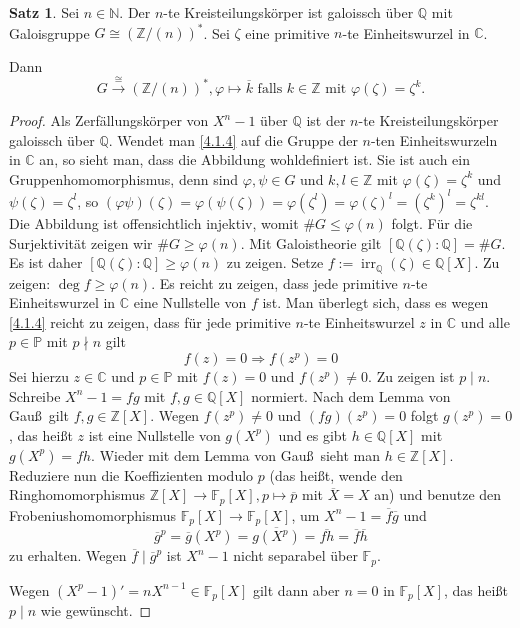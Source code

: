 \documentclass[
twoside=semi,
fontsize=12,
DIV=12, 
cleardoublepage=current,
leqno,
headings=optiontoheadandtoc, 
toc=idx
]{scrbook}
\newcommand{\N}{\mathbb{N}}
\newcommand{\Z}{\mathbb{Z}}
\newcommand{\Q}{\mathbb{Q}}
\newcommand{\C}{\mathbb{C}}
\newcommand{\F}{\mathbb{F}}
\renewcommand{\P}{\mathbb{P}}
\DeclareMathOperator{\irr}{irr}
\theoremstyle{definition}
\newtheorem{satz}[definition]{Satz}
\begin{document}
 	\begin{satz}\label{4.1.11}\hfill\newline
 		Sei $n \in \N$. Der $n$-te Kreisteilungsk\"orper ist galoissch \"uber $\Q$ mit Galoisgruppe $G\cong (\Z/(n))^*$. Sei $\zeta$ eine primitive $n$-te Einheitswurzel in $\C$.
 		
 		\medskip\noindent
 		Dann
 			\[G \overset{\cong}{\to} (\Z/(n))^*, \varphi \mapsto \overline{k} \textrm{ falls } k \in \Z \textrm{ mit } \varphi(\zeta) = \zeta^k.\]
 		
 		\begin{proof}
 			Als Zerf\"allungsk\"orper von $X^n-1$ \"uber $\Q$ ist der $n$-te Kreisteilungsk\"orper galoissch \"uber $\Q$. Wendet man \ref{4.1.4} auf die Gruppe der $n$-ten
 			Einheitswurzeln in $\C$ an, so sieht man, dass die Abbildung wohldefiniert ist. Sie ist auch ein Gruppenhomomorphismus, denn sind $\varphi, \psi \in G$ und $k, l \in \Z$ mit 
 			$\varphi(\zeta) = \zeta^k$ und $\psi(\zeta) = \zeta^l$, so $(\varphi\psi)(\zeta) = \varphi(\psi(\zeta)) = \varphi(\zeta^l) = \varphi(\zeta)^l = (\zeta^k)^l = \zeta^{kl}$. Die Abbildung ist offensichtlich injektiv, womit $\#G \leq \varphi(n)$ folgt. F\"ur die Surjektivit\"at zeigen wir $\#G \geq \varphi(n)$. Mit Galoistheorie gilt $[\Q(\zeta):\Q] =\#G$. Es ist daher $[\Q(\zeta):\Q] \geq \varphi(n)$ zu zeigen. Setze $f:=\irr_\Q(\zeta) \in \Q[X]$. Zu zeigen: $\deg f \geq \varphi(n)$. Es reicht zu zeigen, dass jede primitive $n$-te Einheitswurzel in $\C$ eine Nullstelle von $f$ ist. Man \"uberlegt sich, dass es wegen \ref{4.1.4} reicht zu zeigen, dass f\"ur jede primitive $n$-te Einheitswurzel $z$ in $\C$ und alle $p \in \P$ mit $p \nmid n$ gilt
 				\[f(z) = 0 \Longrightarrow f(z^p) = 0\]
 			Sei hierzu $z \in \C$ und $p \in \P$ mit $f(z) = 0$ und $f(z^p) \neq 0$. Zu zeigen ist $p \mid n$. Schreibe $X^n-1 = fg$ mit
 			$f,g \in \Q[X]$ normiert. Nach dem Lemma von Gau\ss\ gilt $f, g \in \Z[X]$. Wegen $f(z^p) \neq 0$ und $(fg)(z^p) = 0$ folgt $g(z^p) = 0$, das 
 			hei\ss t $z$ ist eine Nullstelle von $g(X^p)$ und es gibt $h \in \Q[X]$ mit $g(X^p) = fh$. Wieder mit dem Lemma von Gau\ss\ sieht man $h \in \Z[X]$. Reduziere nun die Koeffizienten modulo $p$ (das hei\ss t, wende den Ringhomomorphismus $\Z[X] \to \F_p[X], p \mapsto \overline{p}$ mit $\overline{X} = X$ an) und benutze den Frobeniushomomorphismus $\F_p[X] \to \F_p[X]$, um $X^n-1 = \overline{f}\overline{g}$ und
 				\[\overline{g}^p = \overline{g}(X^p) = \overline{g(X^p)} = \overline{fh} = \overline{f}\overline{h}\]
 			zu erhalten. Wegen $\overline{f} \mid \overline{g}^p$ ist $X^n-1$ nicht separabel \"uber $\F_p$. 
 			
 			\noindent Wegen $(X^p-1)' = nX^{n-1} \in \F_p[X]$
 			gilt dann aber $n=0$ in $\F_p[X]$, das hei\ss t $p \mid n$ wie gew\"unscht.
 		\end{proof}
 	\end{satz}
 
\end{document}
